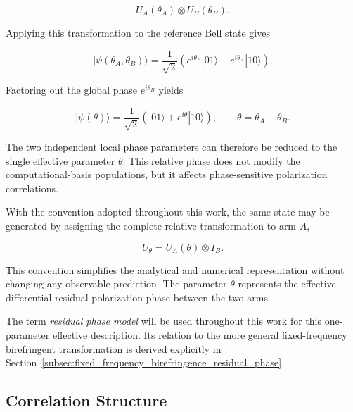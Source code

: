 \begin{equation}
U_A(\theta_A)\otimes U_B(\theta_B).
\label{eq:two_arm_residual_phase_unitary}
\end{equation}

Applying this transformation to the reference Bell state gives

\begin{equation}
|\psi(\theta_A,\theta_B)\rangle
=
\frac{1}{\sqrt{2}}
\left(
e^{i\theta_B}|01\rangle
+
e^{i\theta_A}|10\rangle
\right).
\label{eq:two_arm_residual_phase_bell_state}
\end{equation}

Factoring out the global phase \(e^{i\theta_B}\) yields

\begin{equation}
|\psi(\theta)\rangle
=
\frac{1}{\sqrt{2}}
\left(
|01\rangle
+
e^{i\theta}|10\rangle
\right),
\qquad
\theta=\theta_A-\theta_B.
\label{eq:residual_phase_bell_state}
\end{equation}

The two independent local phase parameters can therefore be reduced to the single
effective parameter \(\theta\). This relative phase does not modify the
computational-basis populations, but it affects phase-sensitive polarization
correlations.

With the convention adopted throughout this work, the same state may be generated
by assigning the complete relative transformation to arm \(A\),

\begin{equation}
U_\theta
=
U_A(\theta)\otimes I_B.
\label{eq:residual_phase_single_arm_convention}
\end{equation}

This convention simplifies the analytical and numerical representation without
changing any observable prediction. The parameter \(\theta\) represents the
effective differential residual polarization phase between the two arms.

The term \emph{residual phase model} will be used throughout this work for this
one-parameter effective description. Its relation to the more general
fixed-frequency birefringent transformation is derived explicitly in
Section~\ref{subsec:fixed_frequency_birefringence_residual_phase}.


\subsection{Correlation Structure}
\label{subsec:residual_phase_correlation_structure}

